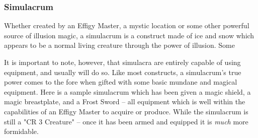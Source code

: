 % 
\subsubsection{Simulacrum}
Whether created by an Effigy Master, a mystic location or some other powerful source of illusion magic, a simulacrum is a construct made of ice and snow which appears to be a normal living creature through the power of illusion. Some 

\noindent{}

It is important to note, however, that simulacra are entirely capable of using equipment, and usually will do so. Like most constructs, a simulacrum's true power comes to the fore when gifted with some basic mundane and magical equipment. Here is a sample simulacrum which has been given a magic shield, a magic breastplate, and a Frost Sword -- all equipment which is well within the capabilities of an Effigy Master to acquire or produce. While the simulacrum is still a "CR 3 Creature" -- once it has been armed and equipped it is \textit{much} more formidable.

